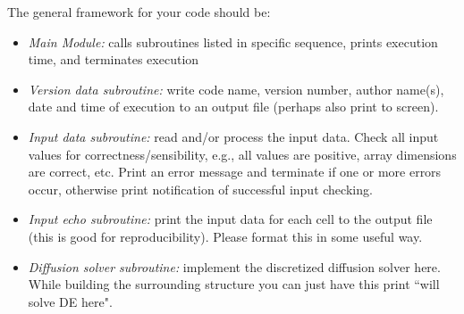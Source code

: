 \documentclass[12pt]{article}
\begin{document}
The general framework for your code should be:
\begin{itemize}
\item \textit{Main Module:} calls subroutines listed in specific sequence, prints execution time, and terminates execution

\item \textit{Version data subroutine:} write code name, version number, author name(s), date and time of execution to an output file (perhaps also print to screen).

\item \textit{Input data subroutine:} read and/or process the input data. Check all input values for correctness/sensibility, e.g., all values are positive, array dimensions are correct, etc. Print an error message and terminate if one or more errors occur, otherwise print notification of successful input checking. 

\item \textit{Input echo subroutine:} print the input data for each cell to the output file (this is good for reproducibility). Please format this in some useful way.

\item \textit{Diffusion solver subroutine:} implement the discretized diffusion solver here. While building the surrounding structure you can just have this print ``will solve DE here". 

\end{itemize}
\end{document}
